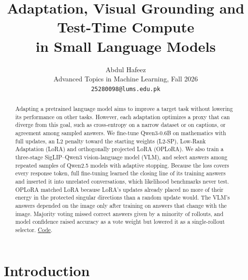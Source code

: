 \documentclass{article}
\title{Adaptation, Visual Grounding and Test-Time Compute\\in Small Language Models}
\author{%
  Abdul Hafeez \\
  Advanced Topics in Machine Learning, Fall 2026\\
  \texttt{25280098@lums.edu.pk}
}
\begin{document}
\maketitle

\begin{abstract}
Adapting a pretrained language model aims to improve a target task without lowering its performance on other tasks. However, each adaptation optimizes a proxy that can diverge from this goal, such as cross-entropy on a narrow dataset or on captions, or agreement among sampled answers. We fine-tune Qwen3-0.6B on mathematics with full updates, an L2 penalty toward the starting weights (L2-SP), Low-Rank Adaptation (LoRA) and orthogonally projected LoRA (OPLoRA). We also train a three-stage SigLIP--Qwen3 vision-language model (VLM), and select answers among repeated samples of Qwen2.5 models with adaptive stopping. Because the loss covers every response token, full fine-tuning learned the closing line of its training answers and inserted it into unrelated conversations, which likelihood benchmarks never test. OPLoRA matched LoRA because LoRA's updates already placed no more of their energy in the protected singular directions than a random update would. The VLM's answers depended on the image only after training on answers that change with the image. Majority voting missed correct answers given by a minority of rollouts, and model confidence raised accuracy as a vote weight but lowered it as a single-rollout selector. \href{https://github.com/hafeez381/llm-adaptation}{Code}.
\end{abstract}

\section{Introduction}
\label{sec:intro}
\end{document}
